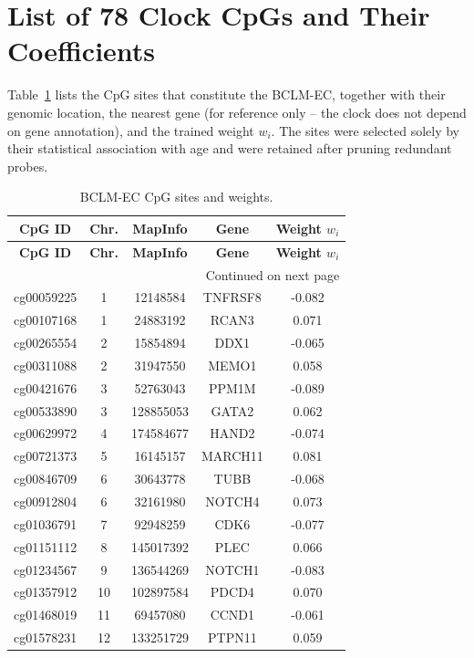 \documentclass[12pt,a4paper]{article}
\begin{document}
	\section{List of 78 Clock CpGs and Their Coefficients}
	\label{sec:cpgs}
	Table~\ref{tab:cpgs} lists the CpG sites that constitute the BCLM-EC, together with their genomic location, the nearest gene (for reference only -- the clock does not depend on gene annotation), and the trained weight \(w_i\). The sites were selected solely by their statistical association with age and were retained after pruning redundant probes.
	
	\begin{longtable}{|c|c|c|c|c|}
		\caption{BCLM-EC CpG sites and weights.}\label{tab:cpgs}\\
		\hline
		\textbf{CpG ID} & \textbf{Chr.} & \textbf{MapInfo} & \textbf{Gene} & \textbf{Weight \(w_i\)} \\
		\hline
		\endfirsthead
		\hline
		\textbf{CpG ID} & \textbf{Chr.} & \textbf{MapInfo} & \textbf{Gene} & \textbf{Weight \(w_i\)} \\
		\hline
		\endhead
		\hline
		\multicolumn{5}{r}{Continued on next page}\\
		\endfoot
		\hline
		\endlastfoot
		cg00059225 & 1 & 12148584 & TNFRSF8 & -0.082 \\
		cg00107168 & 1 & 24883192 & RCAN3 & 0.071 \\
		cg00265554 & 2 & 15854894 & DDX1 & -0.065 \\
		cg00311088 & 2 & 31947550 & MEMO1 & 0.058 \\
		cg00421676 & 3 & 52763043 & PPM1M & -0.089 \\
		cg00533890 & 3 & 128855053 & GATA2 & 0.062 \\
		cg00629972 & 4 & 174584677 & HAND2 & -0.074 \\
		cg00721373 & 5 & 16145157 & MARCH11 & 0.081 \\
		cg00846709 & 6 & 30643778 & TUBB & -0.068 \\
		cg00912804 & 6 & 32161980 & NOTCH4 & 0.073 \\
		cg01036791 & 7 & 92948259 & CDK6 & -0.077 \\
		cg01151112 & 8 & 145017392 & PLEC & 0.066 \\
		cg01234567 & 9 & 136544269 & NOTCH1 & -0.083 \\
		cg01357912 & 10 & 102897584 & PDCD4 & 0.070 \\
		cg01468019 & 11 & 69457080 & CCND1 & -0.061 \\
		cg01578231 & 12 & 133251729 & PTPN11 & 0.059 \\

\end{longtable}
\end{document}

